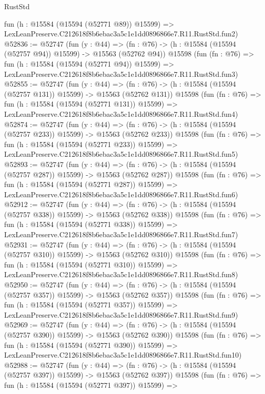 \begin{lexlean}{RustStd}
\begin{coremodule}
    fun (h : @15584 (@15594 (@52771 @89)) @15599) =>
    LexLeanPreserve.C212618f8b6ebac3a5c1e1dd0896866e7.R11.RustStd.fun2)
@52836 := @52747
    (fun (y : @44) =>
    (fn : @76) -> (h : @15584 (@15594 (@52757 @94)) @15599) -> @15563 (@52762 @94))
    @15598
    (fun (fn : @76) =>
    fun (h : @15584 (@15594 (@52771 @94)) @15599) =>
    LexLeanPreserve.C212618f8b6ebac3a5c1e1dd0896866e7.R11.RustStd.fun3)
@52855 := @52747
    (fun (y : @44) =>
    (fn : @76) -> (h : @15584 (@15594 (@52757 @131)) @15599) -> @15563 (@52762 @131))
    @15598
    (fun (fn : @76) =>
    fun (h : @15584 (@15594 (@52771 @131)) @15599) =>
    LexLeanPreserve.C212618f8b6ebac3a5c1e1dd0896866e7.R11.RustStd.fun4)
@52874 := @52747
    (fun (y : @44) =>
    (fn : @76) -> (h : @15584 (@15594 (@52757 @233)) @15599) -> @15563 (@52762 @233))
    @15598
    (fun (fn : @76) =>
    fun (h : @15584 (@15594 (@52771 @233)) @15599) =>
    LexLeanPreserve.C212618f8b6ebac3a5c1e1dd0896866e7.R11.RustStd.fun5)
@52893 := @52747
    (fun (y : @44) =>
    (fn : @76) -> (h : @15584 (@15594 (@52757 @287)) @15599) -> @15563 (@52762 @287))
    @15598
    (fun (fn : @76) =>
    fun (h : @15584 (@15594 (@52771 @287)) @15599) =>
    LexLeanPreserve.C212618f8b6ebac3a5c1e1dd0896866e7.R11.RustStd.fun6)
@52912 := @52747
    (fun (y : @44) =>
    (fn : @76) -> (h : @15584 (@15594 (@52757 @338)) @15599) -> @15563 (@52762 @338))
    @15598
    (fun (fn : @76) =>
    fun (h : @15584 (@15594 (@52771 @338)) @15599) =>
    LexLeanPreserve.C212618f8b6ebac3a5c1e1dd0896866e7.R11.RustStd.fun7)
@52931 := @52747
    (fun (y : @44) =>
    (fn : @76) -> (h : @15584 (@15594 (@52757 @310)) @15599) -> @15563 (@52762 @310))
    @15598
    (fun (fn : @76) =>
    fun (h : @15584 (@15594 (@52771 @310)) @15599) =>
    LexLeanPreserve.C212618f8b6ebac3a5c1e1dd0896866e7.R11.RustStd.fun8)
@52950 := @52747
    (fun (y : @44) =>
    (fn : @76) -> (h : @15584 (@15594 (@52757 @357)) @15599) -> @15563 (@52762 @357))
    @15598
    (fun (fn : @76) =>
    fun (h : @15584 (@15594 (@52771 @357)) @15599) =>
    LexLeanPreserve.C212618f8b6ebac3a5c1e1dd0896866e7.R11.RustStd.fun9)
@52969 := @52747
    (fun (y : @44) =>
    (fn : @76) -> (h : @15584 (@15594 (@52757 @390)) @15599) -> @15563 (@52762 @390))
    @15598
    (fun (fn : @76) =>
    fun (h : @15584 (@15594 (@52771 @390)) @15599) =>
    LexLeanPreserve.C212618f8b6ebac3a5c1e1dd0896866e7.R11.RustStd.fun10)
@52988 := @52747
    (fun (y : @44) =>
    (fn : @76) -> (h : @15584 (@15594 (@52757 @397)) @15599) -> @15563 (@52762 @397))
    @15598
    (fun (fn : @76) =>
    fun (h : @15584 (@15594 (@52771 @397)) @15599) =>

\end{coremodule}
\end{lexlean}
